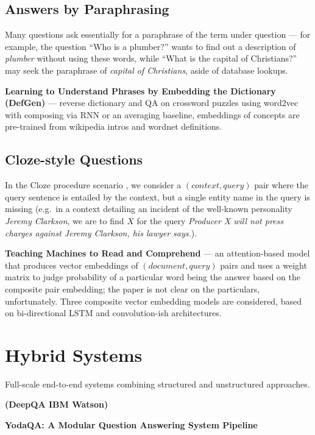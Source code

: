 \subsection{Answers by Paraphrasing}

Many questions ask essentially for a paraphrase of the term under
question --- for example, the question ``Who is a plumber?'' wants
to find out a description of \textit{plumber} without using these
words, while ``What is the capital of Christians?'' may seek the
paraphrase of \textit{capital of Christians}, aside of database lookups.

\textbf{Learning to Understand Phrases by Embedding the Dictionary (DefGen)} \cite{DefGen}
	--- reverse dictionary and QA on crossword puzzles using word2vec
	with composing via RNN or an averaging baseline, embeddings of
	concepts are pre-trained from wikipedia intros and wordnet definitions.

\subsection{Cloze-style Questions}

In the Cloze procedure scenario \cite{Cloze},
we consider a $(context, query)$ pair where the query
sentence is entailed by the context, but a single entity name in the query
is missing (e.g.\ in a context detailing an incident of the well-known personality
\textit{Jeremy Clarkson}, we are to find $X$ for the query
\textit{Producer X will not press charges against Jeremy Clarkson, his lawyer says.}).

\textbf{Teaching Machines to Read and Comprehend} \cite{ReadAndComprehend}
	--- an attention-based model that produces vector embeddings of $(document, query)$
	pairs and uses a weight matrix to judge probability of a particular
	word being the answer based on the composite pair embedding;
	the paper is not clear on the particulars, unfortunately.
	Three composite vector embedding models are considered,
	based on bi-directional LSTM and convolution-ish architectures.

\section{Hybrid Systems}

Full-scale end-to-end systems combining structured and unstructured approaches.

\textbf{(DeepQA IBM Watson)} \cite{WatsonOverview}

\textbf{YodaQA: A Modular Question Answering System Pipeline} \cite{YodaQAPoster2015}
